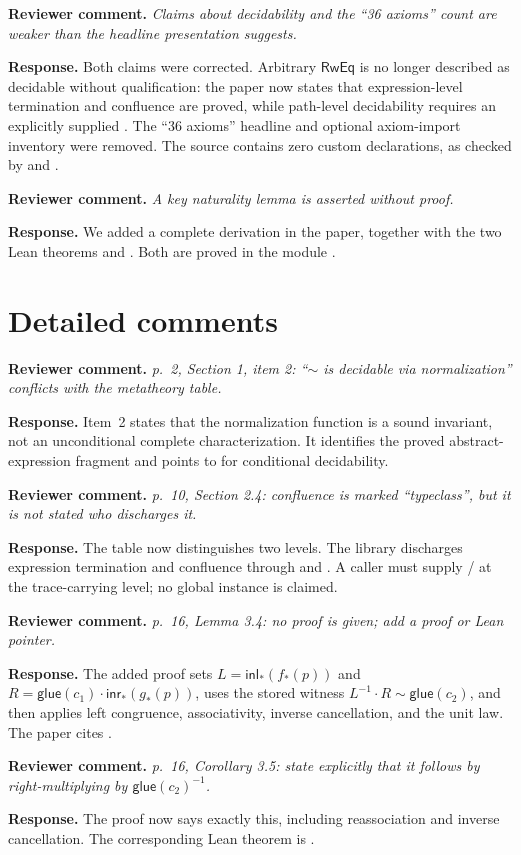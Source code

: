 \documentclass[11pt]{article}
\newcommand{\review}[1]{\par\medskip\noindent
  \textbf{\color{blue!55!black}Reviewer comment.} \emph{#1}\par}
\newcommand{\response}{\par\smallskip\noindent
  \textbf{\color{green!35!black}Response.} }
\begin{document}
\review{Claims about decidability and the ``36 axioms'' count are weaker than
the headline presentation suggests.}
\response
Both claims were corrected.  Arbitrary \(\mathsf{RwEq}\) is no longer described
as decidable without qualification: the paper now states that expression-level
termination and confluence are proved, while path-level decidability requires
an explicitly supplied .  The ``36 axioms'' headline
and optional axiom-import inventory were removed.  The source contains
zero custom  declarations, as checked by
 and .

\review{A key naturality lemma is asserted without proof.}
\response
We added a complete derivation in the paper, together with the two Lean
theorems  and
.  Both are proved in the module
.

\section*{Detailed comments}

\review{p.~2, Section 1, item 2: ``\(\sim\) is decidable via
normalization'' conflicts with the metatheory table.}
\response
Item~2 states that the normalization function is a sound invariant,
not an unconditional complete characterization.  It identifies the proved
abstract-expression fragment and points to
 for conditional decidability.

\review{p.~10, Section 2.4: confluence is marked ``typeclass'', but it is not
stated who discharges it.}
\response
The table now distinguishes two levels.  The library discharges expression
termination and confluence through  and
.  A caller must supply
/ at the trace-carrying
 level; no global instance is claimed.

\review{p.~16, Lemma 3.4: no proof is given; add a proof or Lean pointer.}
\response
The added proof sets
\(L=\mathsf{inl}_*(f_*(p))\) and
\(R=\mathsf{glue}(c_1)\cdot\mathsf{inr}_*(g_*(p))\), uses the stored witness
\(L^{-1}\cdot R\sim\mathsf{glue}(c_2)\), and then applies left congruence,
associativity, inverse cancellation, and the unit law.  The paper cites
.

\review{p.~16, Corollary 3.5: state explicitly that it follows by
right-multiplying by \(\mathsf{glue}(c_2)^{-1}\).}
\response
The proof now says exactly this, including reassociation and inverse
cancellation.  The corresponding Lean theorem is
.
\end{document}
